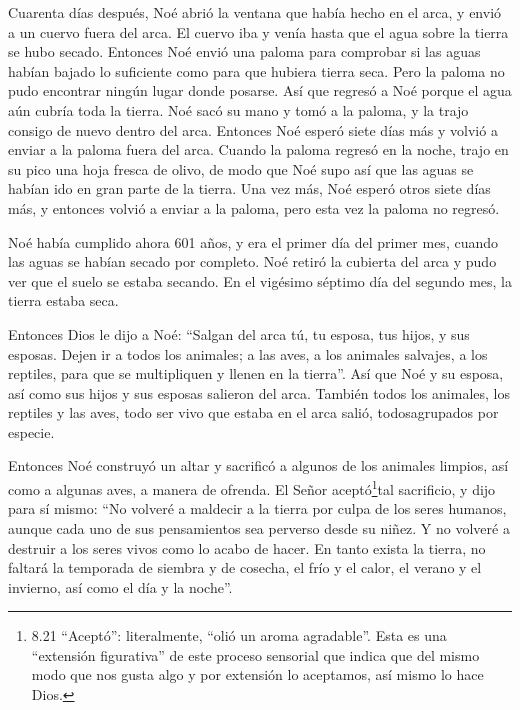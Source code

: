  Cuarenta días después, Noé abrió la ventana que había hecho
en el arca,  y envió a un cuervo fuera del arca. El cuervo
iba y venía hasta que el agua sobre la tierra se hubo secado.
 Entonces Noé envió una paloma para comprobar si las aguas
habían bajado lo suficiente como para que hubiera tierra seca.
 Pero la paloma no pudo encontrar ningún lugar donde
posarse. Así que regresó a Noé porque el agua aún cubría toda la tierra.
Noé sacó su mano y tomó a la paloma, y la trajo consigo de nuevo dentro
del arca.  Entonces Noé esperó siete días más y volvió a
enviar a la paloma fuera del arca.  Cuando la paloma
regresó en la noche, trajo en su pico una hoja fresca de olivo, de modo
que Noé supo así que las aguas se habían ido en gran parte de la tierra.
 Una vez más, Noé esperó otros siete días más, y entonces
volvió a enviar a la paloma, pero esta vez la paloma no regresó.

 Noé había cumplido ahora 601 años, y era el primer día del
primer mes, cuando las aguas se habían secado por completo. Noé retiró
la cubierta del arca y pudo ver que el suelo se estaba secando.
 En el vigésimo séptimo día del segundo mes, la tierra
estaba seca.

 Entonces Dios le dijo a Noé:  ``Salgan del
arca tú, tu esposa, tus hijos, y sus esposas.  Dejen ir a
todos los animales; a las aves, a los animales salvajes, a los reptiles,
para que se multipliquen y llenen en la tierra''.  Así que
Noé y su esposa, así como sus hijos y sus esposas salieron del arca.
 También todos los animales, los reptiles y las aves, todo
ser vivo que estaba en el arca salió, todosagrupados por especie.

 Entonces Noé construyó un altar y sacrificó a algunos de
los animales limpios, así como a algunas aves, a manera de ofrenda.
 El Señor aceptó\footnote{8.21 ``Aceptó'': literalmente,
  ``olió un aroma agradable''. Esta es una ``extensión figurativa'' de
  este proceso sensorial que indica que del mismo modo que nos gusta
  algo y por extensión lo aceptamos, así mismo lo hace Dios.}tal
sacrificio, y dijo para sí mismo: ``No volveré a maldecir a la tierra
por culpa de los seres humanos, aunque cada uno de sus pensamientos sea
perverso desde su niñez. Y no volveré a destruir a los seres vivos como
lo acabo de hacer.  En tanto exista la tierra, no faltará
la temporada de siembra y de cosecha, el frío y el calor, el verano y el
invierno, así como el día y la noche''.

